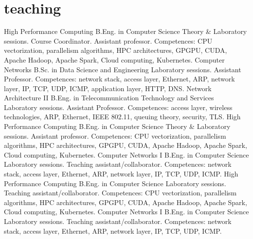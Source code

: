 \documentclass[]{friggeri-cv}
\begin{document}
\section{teaching}
\begin{entrylist}
{High Performance Computing}
{B.Eng. in Computer Science}
{Theory \& Laboratory sessions. Course Coordinator. Assistant professor. Competences: CPU vectorization, parallelism algorithms, HPC architectures, GPGPU, CUDA, Apache Hadoop, Apache Spark, Cloud computing, Kubernetes. 
}
{Computer Networks}
{B.Sc. in Data Science and Engineering}
{Laboratory sessions. Assistant Professor. Competences: network stack, access layer, Ethernet, ARP, network layer, IP, TCP, UDP, ICMP, application layer, HTTP, DNS. 
}
{Network Architecture II}
{B.Eng. in Telecommunication Technology and Services}
{Laboratory sessions. Assistant Professor. Competences: access layer, wireless technologies, ARP, Ethernet, IEEE 802.11, queuing theory, security, TLS. %
}
{High Performance Computing}
{B.Eng. in Computer Science}
{Theory \& Laboratory sessions. Assistant professor. Competences: CPU vectorization, parallelism algorithms, HPC architectures, GPGPU, CUDA, Apache Hadoop, Apache Spark, Cloud computing, Kubernetes. 
}
{Computer Networks I}
{B.Eng. in Computer Science}
{Laboratory sessions. Teaching assistant/collaborator. Competences: network stack, access layer, Ethernet, ARP, network layer, IP, TCP, UDP, ICMP. 
}
{High Performance Computing}
{B.Eng. in Computer Science}
{Laboratory sessions. Teaching assistant/collaborator. Competences: CPU vectorization, parallelism algorithms, HPC architectures, GPGPU, CUDA, Apache Hadoop, Apache Spark, Cloud computing, Kubernetes. 
}
{Computer Networks I}
{B.Eng. in Computer Science}
{Laboratory sessions. Teaching assistant/collaborator. Competences: network stack, access layer, Ethernet, ARP, network layer, IP, TCP, UDP, ICMP. %
}
\end{entrylist}
\end{document}
